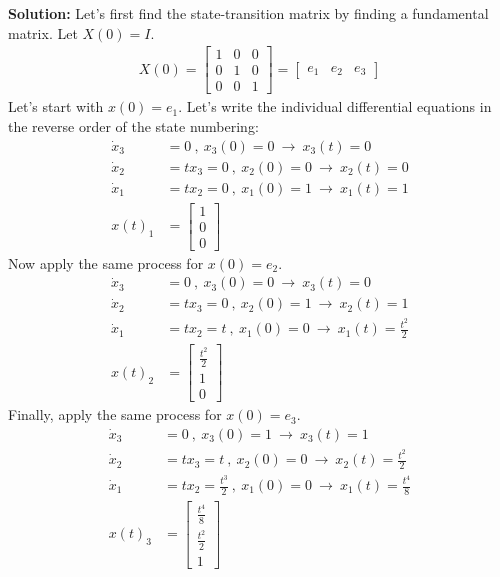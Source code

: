 \documentclass[twoside]{article}
\begin{document}
\textbf{Solution:} Let's first find the state-transition matrix by finding a fundamental matrix. Let $X(0) = I$.
%
\begin{align*}
	X(0) = \begin{bmatrix} 1 & 0 & 0 \\ 0 & 1 & 0 \\ 0 & 0 & 1 \end{bmatrix} 
	= \begin{bmatrix} e_1 & e_2 & e_3  \end{bmatrix} 
\end{align*}
% 
Let's start with $x(0) = e_1$. Let's write the individual differential equations in the reverse order of the state numbering:
%
\begin{align*}
	\dot{x}_3 &= 0 \ , \ x_3(0) = 0 \ \rightarrow \ x_3(t) = 0
	\\
	\dot{x}_2 &= t x_3 = 0\ , \ x_2(0) = 0 \ \rightarrow \ x_2(t) = 0
	\\
	\dot{x}_1 &= t x_2 = 0 \ , \ x_1(0) = 1 \ \rightarrow \ x_1(t) = 1
	\\
	x(t)_1 &= \begin{bmatrix} 1 \\ 0 \\ 0 \end{bmatrix}
\end{align*}
% 
Now apply the same process for $x(0) = e_2$.
%
\begin{align*}
	\dot{x}_3 &= 0 \ , \ x_3(0) = 0 \ \rightarrow \ x_3(t) = 0
	\\
	\dot{x}_2 &= t x_3 = 0 \ , \ x_2(0) = 1 \ \rightarrow \ x_2(t) = 1
	\\
	\dot{x}_1 &= t x_2 = t \ , \ x_1(0) = 0 \ \rightarrow \ x_1(t) = \frac{t^2}{2}
	\\
	x(t)_2 &= \begin{bmatrix} \frac{t^2}{2} \\ 1 \\ 0 \end{bmatrix}
\end{align*}
%
Finally, apply the same process for $x(0) = e_3$.
%
\begin{align*}
	\dot{x}_3 &= 0 \ , \ x_3(0) = 1 \ \rightarrow \ x_3(t) = 1
	\\
	\dot{x}_2 &= t x_3 = t \ , \ x_2(0) = 0 \ \rightarrow \ x_2(t) =  \frac{t^2}{2}
	\\
	\dot{x}_1 &= t x_2 = \frac{t^3}{2} \ , \ x_1(0) = 0 \ \rightarrow \ x_1(t) = \frac{t^4}{8}
	\\
	x(t)_3 &= \begin{bmatrix} \frac{t^4}{8} \\ \frac{t^2}{2} \\ 1 \end{bmatrix}
\end{align*}
\end{document}
